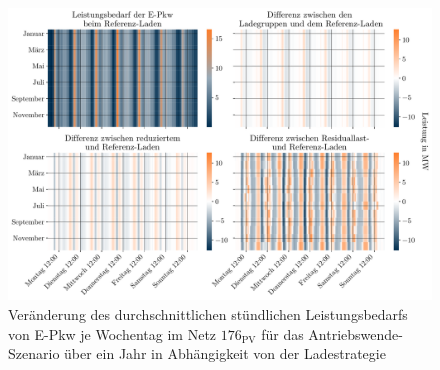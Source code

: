 \begin{figure}[H]
    \centering
    \includegraphics[width=\textwidth]{Bilder/residual_load_diff}
    \caption[Veränderung des durchschnittlichen stündlichen Leistungsbedarfs von E-Pkw je Wochentag im Netz \num{176} für das Antriebswende-Szenario über ein Jahr in Abhängigkeit von der Ladestrategie]{Veränderung des durchschnittlichen stündlichen Leistungsbedarfs von E-Pkw je Wochentag im Netz \(176_{\text{PV}}\) für das Antriebswende-Szenario über ein Jahr in Abhängigkeit von der Ladestrategie}\label{fig:residual_load_diff}
\end{figure}